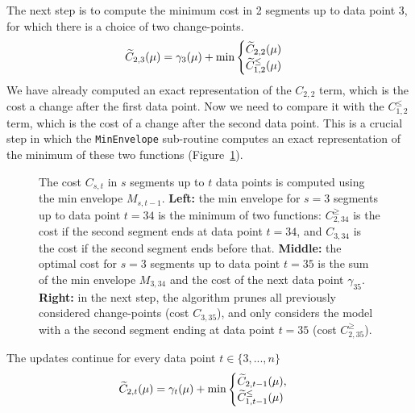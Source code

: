 \documentclass{article}
\begin{document}
The next step is to compute the minimum cost in 2 segments up to data
point 3, for which there is a choice of two change-points.
\begin{equation*}
  \widetilde{C}_{2,3}(\mu) = \gamma_3(\mu)+\min
  \begin{cases}
    \widetilde{C}_{2,2}(\mu) \\
    \widetilde{C}_{1,2}^{\leq}(\mu)
  \end{cases}
\end{equation*}
We have already computed an exact representation of the $C_{2,2}$
term, which is the cost a change after the first data point. Now we
need to compare it with the $C_{1,2}^{\leq}$ term, which is the cost
of a change after the second data point. This is a crucial step in
which the \texttt{MinEnvelope} sub-routine computes an exact
representation of the minimum of these two functions
(Figure~\ref{fig:min-envelope}).

\begin{figure}[!t]
  \begin{center}
  \end{center}
  \caption{\label{fig:min-envelope} The cost $C_{s,t}$ in $s$ segments
    up to $t$ data points is computed using the min envelope
    $M_{s,t-1}$. \textbf{Left:} the min envelope for $s=3$ segments up
    to data point $t=34$ is the minimum of two functions:
    $C^{\geq}_{2,34}$ is the cost if the second segment ends at data
    point $t=34$, and $C_{3,34}$ is the cost if the second segment
    ends before that. \textbf{Middle:} the optimal cost for $s=3$
    segments up to data point $t=35$ is the sum of the min envelope
    $M_{3,34}$ and the cost of the next data point
    $\gamma_{35}$. \textbf{Right:} in the next step, the
    algorithm prunes all previously considered change-points (cost
    $C_{3,35}$), and only considers the model with a the second segment
    ending at data point $t=35$ (cost $C^{\geq}_{2,35}$).}
\end{figure}

The updates continue for every data point $t\in\{3, ..., n\}$
\begin{equation*}
  \widetilde{C}_{2,t}(\mu) =  \gamma_t(\mu) + \min
  \begin{cases}
    \widetilde{C}_{2,t-1}(\mu),\\
    \widetilde{C}_{1,t-1}^{\leq}(\mu) 
  \end{cases}
\end{equation*}
\end{document}
